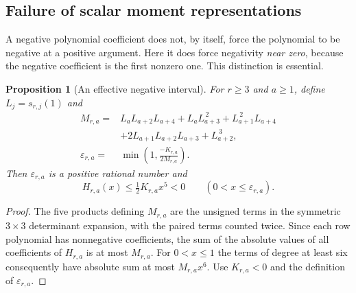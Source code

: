 \documentclass[11pt,a4paper]{article}
\newtheorem{proposition}[theorem]{Proposition}
\theoremstyle{definition}
\numberwithin{equation}{section}
\begin{document}
\subsection{Failure of scalar moment representations}

A negative polynomial coefficient does not, by itself, force the
polynomial to be negative at a positive argument. Here it does force
negativity \emph{near zero}, because the negative coefficient is the
first nonzero one. This distinction is essential.

\begin{proposition}[An effective negative interval]
\label{prop:epsilon}
For $r\ge3$ and $a\ge1$, define $L_j=s_{r,j}(1)$ and
\begin{equation}
 \begin{split}
 M_{r,a}={}&L_aL_{a+2}L_{a+4}+L_aL_{a+3}^{\,2}
            +L_{a+1}^{\,2}L_{a+4}\\
           &+2L_{a+1}L_{a+2}L_{a+3}+L_{a+2}^{\,3},\\
 \varepsilon_{r,a}={}&\min\left(1,\frac{-K_{r,a}}{2M_{r,a}}\right).
 \end{split}
 \label{eq:epsilon}
\end{equation}
Then $\varepsilon_{r,a}$ is a positive rational number and
\begin{equation}
 H_{r,a}(x)\le \tfrac12K_{r,a}x^5<0
 \qquad(0<x\le\varepsilon_{r,a}).
 \label{eq:epsilon-result}
\end{equation}
\end{proposition}
\begin{proof}
The five products defining $M_{r,a}$ are the unsigned terms in the
symmetric $3\times3$ determinant expansion, with the paired terms counted
twice. Since each row polynomial has nonnegative coefficients, the sum
of the absolute values of all coefficients of $H_{r,a}$ is at most
$M_{r,a}$. For $0<x\le1$ the terms of degree at least six consequently
have absolute sum at most $M_{r,a}x^6$. Use
$K_{r,a}<0$ and the definition of $\varepsilon_{r,a}$.
\end{proof}
\end{document}
